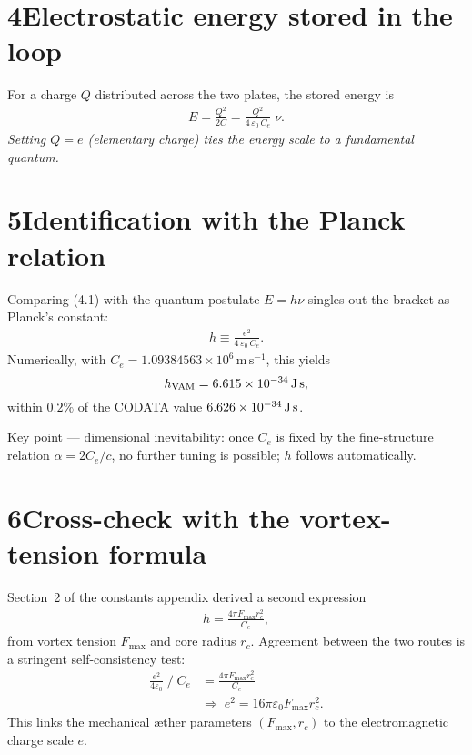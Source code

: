 \documentclass[11pt]{article}
\begin{document}
\section*{4\quad Electrostatic energy stored in the loop}

For a charge $Q$ distributed across the two plates, the stored energy is
\begin{align}
    E = \frac{Q^2}{2C}
      = \frac{Q^2}{4\,\varepsilon_0\,C_e}\;\nu.
    \tag{4.1}
\end{align}
\textit{Setting $Q=e$ (elementary charge) ties the energy scale to a fundamental quantum.}

\section*{5\quad Identification with the Planck relation}

Comparing (4.1) with the quantum postulate $E = h\nu$ singles out the bracket as Planck’s constant:
\begin{align}
    h \equiv \frac{e^{2}}{4\,\varepsilon_0\,C_e}.
    \tag{5.1}
\end{align}
Numerically, with $C_e = 1.09384563\times10^{6}\,\text{m}\,\text{s}^{-1}$, this yields
\[
    h_{\text{VAM}} = 6.615\times10^{-34}\,\text{J\,s},
\]
within $0.2\%$ of the CODATA value $6.626\times10^{-34}\,\text{J\,s}$.

Key point --- dimensional inevitability: once $C_e$ is fixed by the fine-structure relation $\alpha = 2C_e/c$, no further tuning is possible; $h$ follows automatically.

\section*{6\quad Cross-check with the vortex-tension formula}

Section~2 of the constants appendix derived a second expression
\begin{align}
    h = \frac{4\pi F_{\max} r_c^{2}}{C_e},
\end{align}
from vortex tension $F_{\max}$ and core radius $r_c$. Agreement between the two routes is a stringent self-consistency test:
\begin{align*}
    \frac{e^{2}}{4\varepsilon_0}\;\big/\;C_e
    &= \frac{4\pi F_{\max} r_c^{2}}{C_e} \\
    &\Longrightarrow\;
    e^{2} = 16\pi\varepsilon_0 F_{\max} r_c^{2}.
\end{align*}
This links the mechanical æther parameters $(F_{\max}, r_c)$ to the electromagnetic charge scale $e$.
\end{document}
